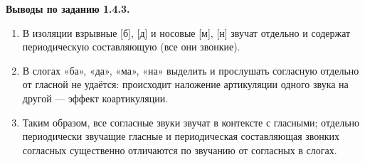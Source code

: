 \textbf{Выводы по заданию 1.4.3.}
\begin{enumerate}
	\item В изоляции взрывные [б], [д] и носовые [м], [н] звучат
		отдельно и содержат периодическую составляющую (все они
		звонкие).
	\item В слогах «ба», «да», «ма», «на» выделить и прослушать
		согласную отдельно от гласной не удаётся: происходит наложение
		артикуляции одного звука на другой --- эффект коартикуляции.
	\item Таким образом, все согласные звуки звучат в контексте
		с гласными; отдельно периодически звучащие гласные и
		периодическая составляющая звонких согласных существенно
		отличаются по звучанию от согласных в слогах.
\end{enumerate}
